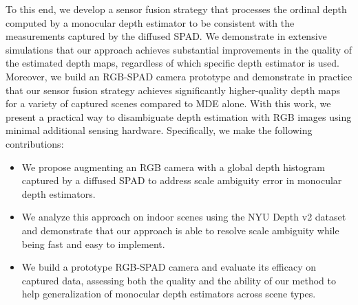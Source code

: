 
To this end, we develop a sensor fusion strategy that processes the ordinal depth computed by a monocular depth estimator to be consistent with the measurements captured by the diffused SPAD. We demonstrate in extensive simulations that our approach achieves substantial improvements in the quality of the estimated depth maps, regardless of which specific depth estimator is used. Moreover, we build an RGB-SPAD camera prototype and demonstrate in practice that our sensor fusion strategy achieves significantly higher-quality depth maps for a variety of captured scenes compared to MDE alone. With this work, we present a practical way to disambiguate depth estimation with RGB images using minimal additional sensing hardware. Specifically, we make the following contributions:
%
\begin{itemize}
	\item We propose augmenting an RGB camera with a global depth histogram captured by a diffused SPAD to address scale ambiguity error in monocular depth estimators.	
  \item We analyze this approach on indoor scenes using the NYU Depth v2 dataset and demonstrate that our approach is able to resolve scale ambiguity while being fast and easy to implement.
	\item We build a prototype RGB-SPAD camera and evaluate its efficacy on captured data, assessing both the quality and the ability of our method to help generalization of monocular depth estimators across scene types. 
\end{itemize}


